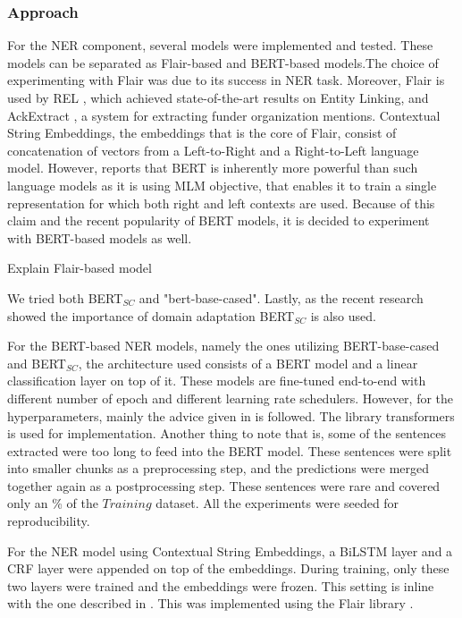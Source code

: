 \documentclass{article}
\theoremstyle{definition}
\theoremstyle{remark}
\begin{document}
\subsubsection{Approach}
\label{sec:NERmodels}

For the NER component, several models were implemented and tested. These models can be separated as Flair-based \cite{flairpaper} and  BERT-based \cite{BERT} models.The choice of experimenting with Flair was due to its success in NER task. Moreover, Flair is used by REL \cite{REL}, which achieved state-of-the-art results on Entity Linking,  and AckExtract \cite{AckExtract}, a system for extracting funder organization mentions. Contextual String Embeddings, the embeddings that is the core of Flair, consist of concatenation of vectors from a Left-to-Right and a Right-to-Left language model. However, \cite{BERT} reports that BERT is inherently more powerful than such language models as it is using MLM objective, that enables it to train a single representation for which both right and left contexts are used. Because of this claim and the recent popularity of BERT models, it is decided to experiment with BERT-based models as well.

Explain Flair-based model

We tried both BERT$_{SC}$ and "bert-base-cased".  Lastly, as the recent research showed the importance of domain adaptation \textcolor{red}{\cite{}} BERT$_{SC}$ is also used. 




For the BERT-based NER models, namely the ones utilizing BERT-base-cased and BERT$_{SC}$, the architecture used consists of a BERT model and a linear classification layer on top of it. These models are fine-tuned end-to-end with different number of epoch and different learning rate schedulers. However, for the hyperparameters, mainly the advice given in \cite{BERT} is followed. The library transformers \textcolor{red}{\cite{}} is used for implementation. Another thing to note that is, some of the sentences extracted were too long to feed into the BERT model.  These sentences were split into smaller chunks as a preprocessing step, and the predictions were merged together again as a postprocessing step. These sentences were rare and covered only an  \textcolor{red}{\cite{}} \% of the $Training$ dataset. All the experiments were seeded for reproducibility.

For the NER model using Contextual String Embeddings, a BiLSTM layer and a CRF layer were appended on top of the embeddings. During training, only these two layers were trained and the embeddings were frozen. This setting is inline with the one described in \cite{flairpaper}. This was implemented using the Flair library  \textcolor{red}{\cite{}}.
\end{document}
